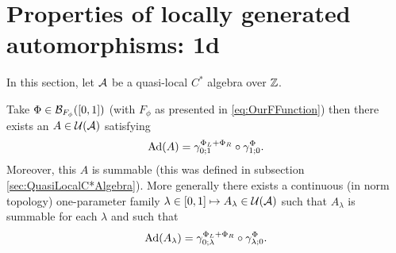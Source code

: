 \documentclass[11pt,a4paper,twoside]{article}
\numberwithin{equation}{section}
\begin{document}
	\section{Properties of locally generated automorphisms: 1d}
	In this section, let $\AA$ be a quasi-local $C^*$ algebra over $\ZZ$.
	\begin{lemma}\label{lem:PropertiesLocallyGeneratedAutomorphisms1d}
		Take $\Phi\in\BB_{F_\phi}([0,1])$ (with $F_\phi$ as presented in \eqref{eq:OurFFunction}) then there exists an $A\in\UU(\AA)$ satisfying
		\begin{equation}
			\Ad{A}=\gamma^{\Phi_L+\Phi_R}_{0;1}\circ\gamma^\Phi_{1;0}.
		\end{equation}
		Moreover, this $A$ is summable (this was defined in subsection \ref{sec:QuasiLocalC*Algebra}). More generally there exists a continuous (in norm topology) one-parameter family $\lambda\in[0,1]\mapsto A_\lambda\in\UU(\AA)$ such that $A_\lambda$ is summable for each $\lambda$ and such that
		\begin{equation}
			\Ad{A_\lambda}=\gamma^{\Phi_L+\Phi_R}_{0;\lambda}\circ\gamma^\Phi_{\lambda;0}.
		\end{equation}
	\end{lemma}
\end{document}

